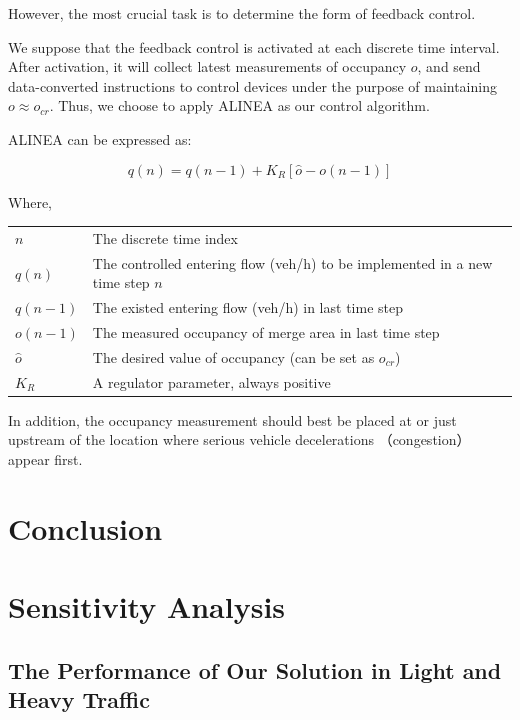 \documentclass{mcmthesis}
\begin{document}
However, the most crucial task is to determine the
form of feedback control.


We suppose that the feedback control is activated
at each discrete time interval. After activation, it
will collect latest measurements of occupancy $o$, and
send data-converted instructions to control devices
under the purpose of maintaining $o  \approx  o_{cr}$.
Thus, we choose to apply ALINEA as our control algorithm.

ALINEA can be expressed as:

\[q\left( n \right) = q\left( {n - 1} \right) + {K_R}\left[ {\hat{o}  - o(n - 1)} \right]\]

Where,

\begin{table}[htbp]
  \centering
    \begin{tabular}{ll}
      \toprule
    $n$     & The discrete time index \\
    $q(n)$  & The controlled entering flow (veh/h) to be implemented in a new time step $n$ \\
    $q(n-1)$ & The existed entering flow (veh/h) in last time step \\
    $o(n-1)$ & The measured occupancy of merge area in last time step \\
    $\hat{o}$ & The desired value of occupancy (can be set as $o_{cr}$) \\
    $K_{R}$  & A regulator parameter, always positive \\
    \bottomrule
    \end{tabular}%
  \label{tab:addlabel}%
\end{table}%

In addition, the occupancy measurement should best be
placed at or just upstream of the location where serious
vehicle decelerations （congestion） appear first.

\section{Conclusion}

\section{Sensitivity Analysis}
\subsection{The Performance of Our Solution in Light
and Heavy Traffic}
\end{document}
